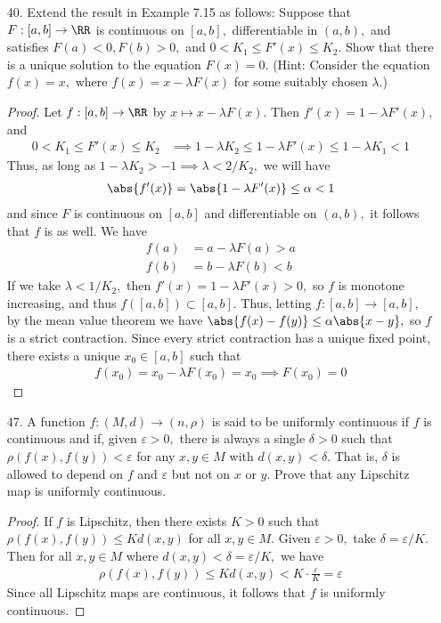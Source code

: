 \documentclass{article}
\begin{document}
\begin{itemize}
	\item[40.] Extend the result in Example 7.15 as follows: Suppose that $F:[a, b]\to \RR$ is continuous on $[a, b],$ differentiable in $(a, b),$ and satisfies $F(a)<0, F(b)>0,$ and $0<K_1\le F'(x)\le K_2.$ Show that there is a unique solution to the equation $F(x)=0.$ (Hint: Consider the equation $f(x)=x,$ where $f(x)=x-\lambda F(x)$ for some suitably chosen $\lambda$.)
		\begin{proof}
			Let $f:[a, b]\to\RR$ by $x\mapsto x-\lambda F(x).$ Then $f'(x)=1-\lambda F'(x),$ and
			\begin{align*}
				0 < K_1\le F'(x) \le K_2 &\implies 1-\lambda K_2 \le 1-\lambda F'(x)\le 1-\lambda K_1 < 1 
			\end{align*}
			Thus, as long as $1-\lambda K_2>-1\implies \lambda < 2/K_2,$ we will have
			\begin{align*}
				\abs{f'(x)} = \abs{1-\lambda F'(x)} \le \alpha < 1
			\end{align*}
			and since $F$ is continuous on $[a, b]$ and differentiable on $(a, b),$ it follows that $f$ is as well. We have
			\begin{align*}
				f(a) &= a - \lambda F(a) > a \\
				f(b) &= b - \lambda F(b) < b
			\end{align*}
			If we take $\lambda < 1/K_2,$ then $f'(x)=1-\lambda F'(x) > 0,$ so $f$ is monotone increasing, and thus $f([a, b])\subset [a, b].$ Thus, letting $f:[a, b]\to[a, b],$ by the mean value theorem we have $\abs{f(x)-f(y)}\le \alpha\abs{x-y},$ so $f$ is a strict contraction. Since every strict contraction has a unique fixed point, there exists a unique $x_0\in[a, b]$ such that 
			\begin{align*}
				f(x_0)=x_0-\lambda F(x_0) = x_0\implies F(x_0)=0
			\end{align*}
		\end{proof}

	\item[47.] A function $f:(M, d)\to (n, \rho)$ is said to be uniformly continuous if $f$ is continuous and if, given $\varepsilon>0,$ there is always a single $\delta>0$ such that $\rho(f(x), f(y))<\varepsilon$ for any $x, y\in M$ with $d(x, y)<\delta.$ That is, $\delta$ is allowed to depend on $f$ and $\varepsilon$ but not on $x$ or $y.$ Prove that any Lipschitz map is uniformly continuous.
		\begin{proof}
			If $f$ is Lipschitz, then there exists $K>0$ such that $\rho(f(x), f(y))\le Kd(x, y)$ for all $x, y\in M.$ Given $\varepsilon>0,$ take $\delta=\varepsilon/K.$ Then for all $x, y\in M$ where $d(x, y)<\delta=\varepsilon/K,$ we have
			\begin{align*}
				\rho(f(x), f(y))\le Kd(x, y)< K\cdot \frac{\varepsilon}{K} = \varepsilon
			\end{align*}
			Since all Lipschitz maps are continuous, it follows that $f$ is uniformly continuous.
		\end{proof}
		
\end{itemize}
\end{document}
